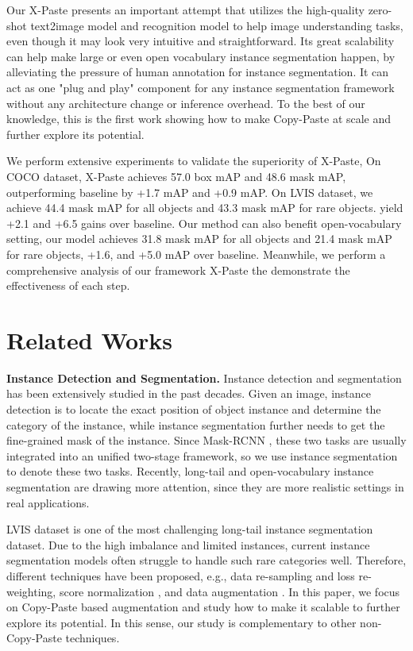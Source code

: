 \documentclass{article}
\begin{document}
Our X-Paste presents an important attempt that utilizes the high-quality zero-shot text2image model and recognition model to help image understanding tasks, even though it may look very intuitive and straightforward. Its great scalability can help make large or even open vocabulary instance segmentation happen, by alleviating the pressure of human annotation for instance segmentation. It can act as one "plug and play" component for any instance segmentation framework without any architecture change or inference overhead. To the best of our knowledge, this is the first work showing how to make Copy-Paste at scale and further explore its potential.


We perform extensive experiments to validate the superiority of X-Paste, On COCO dataset, X-Paste achieves 57.0 box mAP and 48.6 mask mAP, outperforming baseline by +1.7 mAP and +0.9 mAP. On LVIS dataset, we achieve 44.4 mask mAP for all objects and 43.3 mask mAP for rare objects. yield +2.1 and +6.5 gains over baseline. Our method can also benefit open-vocabulary setting, our model achieves 31.8 mask mAP for all objects and 21.4 mask mAP for rare objects, +1.6, and +5.0 mAP over baseline.
Meanwhile, we perform a comprehensive analysis of our framework X-Paste the demonstrate the effectiveness of each step. 



\section{Related Works}
\label{sec:relatedwork}

\noindent\textbf{Instance Detection and Segmentation.}
Instance detection and segmentation \cite{he2017mask,dai2021dynamic,meng2022detection,li2022mask} has been extensively studied in the past decades. Given an image, instance detection is to locate the exact position of object instance and determine the category of the instance, while instance segmentation further needs to get the fine-grained mask of the instance. Since Mask-RCNN \cite{he2017mask}, these two tasks are usually integrated into an unified two-stage framework, so we use instance segmentation to denote these two tasks. Recently, long-tail and open-vocabulary instance segmentation are drawing more attention, since they are more realistic settings in real applications.

LVIS dataset \cite{LVIS} is one of the most challenging long-tail instance segmentation dataset. Due to the high imbalance and limited instances, current instance segmentation models often struggle to handle such rare categories well. Therefore, different techniques have been proposed, e.g., data re-sampling and loss re-weighting\cite{wang2020devil,mahajan2018exploring,zang2021fasa,tan2021equalization,wang2021seesaw}, score normalization \cite{pan2021model}, and data augmentation \cite{Simple-Copy-Paste}. In this paper, we focus on Copy-Paste based augmentation and 
study how to make it scalable to further explore its potential. In this sense, our study is complementary to other non-Copy-Paste techniques. 
\end{document}
